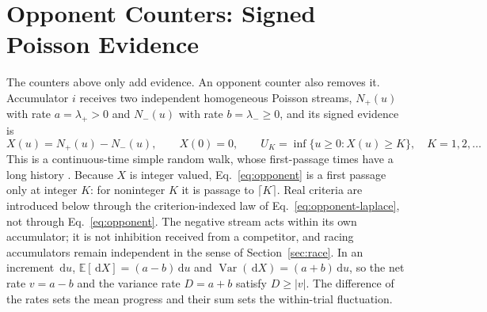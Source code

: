 \documentclass[12pt]{article}
\newcommand{\dd}{\,\mathrm{d}}
\newcommand{\E}{\mathbb{E}}
\newcommand{\Var}{\operatorname{Var}}
\theoremstyle{definition}
\theoremstyle{plain}
\theoremstyle{remark}
\begin{document}
\section{Opponent Counters: Signed Poisson Evidence}\label{sec:opponent}

The counters above only add evidence. An opponent counter also removes it. Accumulator $i$ receives two independent homogeneous Poisson streams, $N_{+}(u)$ with rate $a=\lambda_+>0$ and $N_{-}(u)$ with rate $b=\lambda_-\geq0$, and its signed evidence is
\begin{equation}
 X(u)=N_{+}(u)-N_{-}(u),\qquad X(0)=0,\qquad
 U_K=\inf\{u\geq0:X(u)\geq K\},\quad K=1,2,\ldots\label{eq:opponent}
\end{equation}
This is a continuous-time simple random walk, whose first-passage times have a long history \cite{Feller1971,Masuda1988}. Because $X$ is integer valued, Eq.~\eqref{eq:opponent} is a first passage only at integer $K$: for noninteger $K$ it is passage to $\lceil K\rceil$. Real criteria are introduced below through the criterion-indexed law of Eq.~\eqref{eq:opponent-laplace}, not through Eq.~\eqref{eq:opponent}. The negative stream acts within its own accumulator; it is not inhibition received from a competitor, and racing accumulators remain independent in the sense of Section~\ref{sec:race}. In an increment $\dd u$, $\E[\dd X]=(a-b)\dd u$ and $\Var(\dd X)=(a+b)\dd u$, so the net rate $v=a-b$ and the variance rate $D=a+b$ satisfy $D\geq|v|$. The difference of the rates sets the mean progress and their sum sets the within-trial fluctuation.
\end{document}

